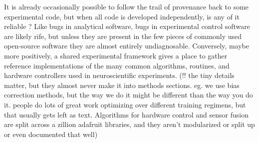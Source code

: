 \documentclass[10pt]{article}
\begin{document}
\begin{multicols}{2}
It is already occasionally possible to follow the trail of provenance
back to some experimental code, but when all code is developed
independently, is any of it reliable \cite{wallReliabilityStartsExperimental2018} ? Like bugs in analytical
software, bugs in experimental control software are likely rife, but
unless they are present in the few pieces of commonly used open-source
software they are almost entirely undiagnosable. Conversely, maybe more
positively, a shared experimental framework gives a place to gather
reference implementations of the many common algorithms, routines, and
hardware controllers used in neuroscientific experiments. (!! the tiny
details matter, but they almost never make it into methods sections. eg.
we use bias correction methods, but the way we do it might be different
than the way you do it. people do lots of great work optimizing over
different training regimens, but that usually gets left as text.
Algorithms for hardware control and sensor fusion are split across a
zillion adafruit libraries, and they aren't modularized or split up or
even documented that well)


\end{multicols}
\end{document}
